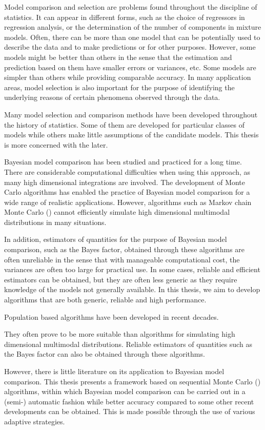 Model comparison and selection are problems found throughout the discipline of statistics. It can appear in different forms, such as the choice of regressors in regression analysis, or the determination of the number of components in mixture models. Often, there can be more than one model that can be potentially used to describe the data and to make predictions or for other purposes. However, some models might be better than others in the sense that the estimation and prediction based on them have smaller errors or variances, etc. Some models are simpler than others while providing comparable accuracy. In many application areas, model selection is also important for the purpose of identifying the underlying reasons of certain phenomena observed through the data.
\begin{draftpar}
Many model selection and comparison methods have been developed throughout the history of statistics. Some of them are developed for particular classes of models while others make little assumptions of the candidate models. This thesis is more concerned with the later.
\end{draftpar}

Bayesian model comparison has been studied and practiced for a long time. There are considerable computational difficulties when using this approach, as many high dimensional integrations are involved. The development of Monte Carlo algorithms has enabled the practice of Bayesian model comparison for a wide range of realistic applications. However, algorithms such as Markov chain Monte Carlo (\mcmc) cannot efficiently simulate high dimensional multimodal distributions in many situations.
\begin{draftpar}
In addition, estimators of quantities for the purpose of Bayesian model comparison, such as the Bayes factor, obtained through these algorithms are often unreliable in the sense that with manageable computational cost, the variances are often too large for practical use. In some cases, reliable and efficient estimators can be obtained, but they are often less generic as they require knowledge of the models not generally available. In this thesis, we aim to develop algorithms that are both generic, reliable and high performance.
\end{draftpar}

Population based algorithms have been developed in recent decades.
\begin{draftpar}
They often prove to be more suitable than \mcmc algorithms for simulating high dimensional multimodal distributions. Reliable estimators of quantities such as the Bayes factor can also be obtained through these algorithms.
\end{draftpar}
However, there is little literature on its application to Bayesian model comparison. This thesis presents a framework based on sequential Monte Carlo (\smc) algorithms, within which Bayesian model comparison can be carried out in a (semi-) automatic fashion while better accuracy compared to some other recent developments can be obtained. This is made possible through the use of various adaptive strategies.


